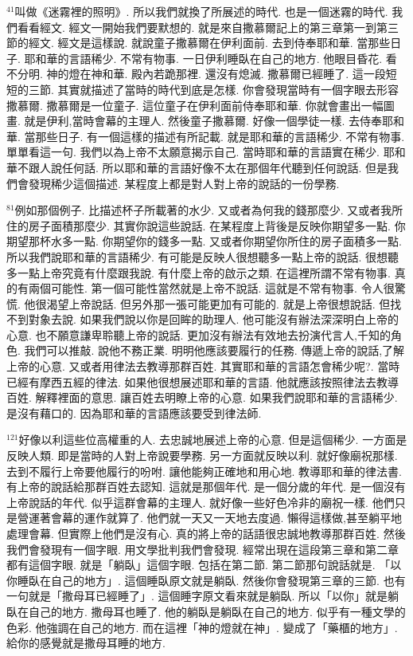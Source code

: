\documentclass{book}
\begin{document}
$^{41}$叫做《迷霧裡的照明》.
所以我們就換了所展述的時代.
也是一個迷霧的時代.
我們看看經文.
經文一開始我們要默想的.
就是來自撒慕爾記上的第三章第一到第三節的經文.
經文是這樣說.
就說童子撒慕爾在伊利面前.
去到侍奉耶和華.
當那些日子.
耶和華的言語稀少.
不常有物事.
一日伊利睡臥在自己的地方.
他眼目昏花.
看不分明.
神的燈在神和華.
殿內若跪那裡.
還沒有熄滅.
撒慕爾已經睡了.
這一段短短的三節.
其實就描述了當時的時代到底是怎樣.
你會發現當時有一個字眼去形容撒慕爾.
撒慕爾是一位童子.
這位童子在伊利面前侍奉耶和華.
你就會畫出一幅圖畫.
就是伊利,當時會幕的主理人.
然後童子撒慕爾.
好像一個學徒一樣.
去侍奉耶和華.
當那些日子.
有一個這樣的描述有所記載.
就是耶和華的言語稀少.
不常有物事.
單單看這一句.
我們以為上帝不太願意揭示自己.
當時耶和華的言語實在稀少.
耶和華不跟人說任何話.
所以耶和華的言語好像不太在那個年代聽到任何說話.
但是我們會發現稀少這個描述.
某程度上都是對人對上帝的說話的一份學務.

$^{81}$例如那個例子.
比描述杯子所載著的水少.
又或者為何我的錢那麼少.
又或者我所住的房子面積那麼少.
其實你說這些說話.
在某程度上背後是反映你期望多一點.
你期望那杯水多一點.
你期望你的錢多一點.
又或者你期望你所住的房子面積多一點.
所以我們說耶和華的言語稀少.
有可能是反映人很想聽多一點上帝的說話.
很想聽多一點上帝究竟有什麼跟我說.
有什麼上帝的啟示之類.
在這裡所謂不常有物事.
真的有兩個可能性.
第一個可能性當然就是上帝不說話.
這就是不常有物事.
令人很驚慌.
他很渴望上帝說話.
但另外那一張可能更加有可能的.
就是上帝很想說話.
但找不到對象去說.
如果我們說以你是回眸的助理人.
他可能沒有辦法深深明白上帝的心意.
也不願意謙卑聆聽上帝的說話.
更加沒有辦法有效地去扮演代言人,千知的角色.
我們可以推敲.
說他不務正業.
明明他應該要履行的任務.
傳遞上帝的說話,了解上帝的心意.
又或者用律法去教導那群百姓.
其實耶和華的言語怎會稀少呢?.
當時已經有摩西五經的律法.
如果他很想展述耶和華的言語.
他就應該按照律法去教導百姓.
解釋裡面的意思.
讓百姓去明瞭上帝的心意.
如果我們說耶和華的言語稀少.
是沒有藉口的.
因為耶和華的言語應該要受到律法師.

$^{121}$好像以利這些位高權重的人.
去忠誠地展述上帝的心意.
但是這個稀少.
一方面是反映人類.
即是當時的人對上帝說要學務.
另一方面就反映以利.
就好像廟祝那樣.
去到不履行上帝要他履行的吩咐.
讓他能夠正確地和用心地.
教導耶和華的律法書.
有上帝的說話給那群百姓去認知.
這就是那個年代.
是一個分歲的年代.
是一個沒有上帝說話的年代.
似乎這群會幕的主理人.
就好像一些好色冷非的廟祝一樣.
他們只是營運著會幕的運作就算了.
他們就一天又一天地去度過.
懶得這樣做,甚至躺平地處理會幕.
但實際上他們是沒有心.
真的將上帝的話語很忠誠地教導那群百姓.
然後我們會發現有一個字眼.
用文學批判我們會發現.
經常出現在這段第三章和第二章都有這個字眼.
就是「躺臥」這個字眼.
包括在第二節.
第二節那句說話就是.
「以你睡臥在自己的地方」.
這個睡臥原文就是躺臥.
然後你會發現第三章的三節.
也有一句就是「撒母耳已經睡了」.
這個睡字原文看來就是躺臥.
所以「以你」就是躺臥在自己的地方.
撒母耳也睡了.
他的躺臥是躺臥在自己的地方.
似乎有一種文學的色彩.
他強調在自己的地方.
而在這裡「神的燈就在神」.
變成了「藥櫃的地方」.
給你的感覺就是撒母耳睡的地方.
\end{document}
